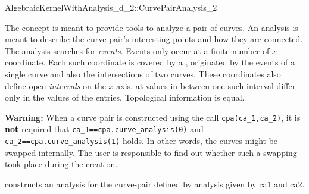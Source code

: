 \begin{ccRefConcept}{AlgebraicKernelWithAnalysis_d_2::CurvePairAnalysis_2}

\ccDefinition

The  concept is meant to provide tools to analyze 
a pair of curves. An analysis is meant to describe the curve pair's 
interesting points and how they are connected. 
The analysis searches for {\it events}. Events only
occur at a finite number of $x$-coordinate. Each such coordinate is
covered by a , 
originated by the events of a single curve
and also the intersections of two curves.
These coordinates also define open {\it intervals}
on the $x$-axis.  
at values in between one such interval
differ only in the values of the  entries. Topological 
information is equal. 

{\bf Warning:} When a curve pair is constructed using the call
{\tt cpa(ca\_1,ca\_2)}, it is {\bf not} required that 
{\tt ca\_1==cpa.curve\_analysis(0)} and {\tt ca\_2==cpa.curve\_analysis(1)} 
holds.
In other words, the curves might be swapped internally.
The user is responsible to find out whether such a swapping took place
during the creation.


\ccTypes






\ccCreation
{}

{constructs an analysis for the curve-pair defined by analysis given by 
ca1 and ca2. 
}

\begin{ccAdvanced}


\end{ccAdvanced}
\end{ccRefConcept}
